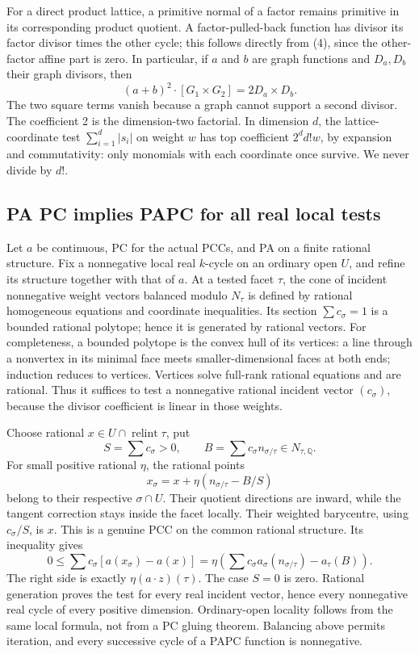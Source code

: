 \documentclass[
  10pt,
]{article}
\begin{document}
For a direct product lattice, a primitive normal of a factor remains
primitive in its corresponding product quotient. A factor-pulled-back
function has divisor its factor divisor times the other cycle; this
follows directly from (4), since the other-factor affine part is zero.
In particular, if \(a\) and \(b\) are graph functions and \(D_a,D_b\)
their graph divisors, then \[
 (a+b)^2\cdot[G_1\times G_2]=2D_a\times D_b.                  \tag{7}
\] The two square terms vanish because a graph cannot support a second
divisor. The coefficient 2 is the dimension-two factorial. In dimension
\(d\), the lattice-coordinate test \(\sum_{i=1}^d|s_i|\) on weight \(w\)
has top coefficient \(2^d d!w\), by expansion and commutativity: only
monomials with each coordinate once survive. We never divide by \(d!\).

\subsection{PA PC implies PAPC for all real local
tests}\label{pa-pc-implies-papc-for-all-real-local-tests}

Let \(a\) be continuous, PC for the actual PCCs, and PA on a finite
rational structure. Fix a nonnegative local real \(k\)-cycle on an
ordinary open \(U\), and refine its structure together with that of
\(a\). At a tested facet \(\tau\), the cone of incident nonnegative
weight vectors balanced modulo \(N_\tau\) is defined by rational
homogeneous equations and coordinate inequalities. Its section
\(\sum c_\sigma=1\) is a bounded rational polytope; hence it is
generated by rational vectors. For completeness, a bounded polytope is
the convex hull of its vertices: a line through a nonvertex in its
minimal face meets smaller-dimensional faces at both ends; induction
reduces to vertices. Vertices solve full-rank rational equations and are
rational. Thus it suffices to test a nonnegative rational incident
vector \((c_\sigma)\), because the divisor coefficient is linear in
those weights.

Choose rational \(x\in U\cap\operatorname{relint}\tau\), put \[
 S=\sum c_\sigma>0,\qquad B=\sum c_\sigma n_{\sigma/\tau}\in N_{\tau,\mathbb Q}.
\] For small positive rational \(\eta\), the rational points \[
 x_\sigma=x+\eta(n_{\sigma/\tau}-B/S)
\] belong to their respective \(\sigma\cap U\). Their quotient
directions are inward, while the tangent correction stays inside the
facet locally. Their weighted barycentre, using \(c_\sigma/S\), is
\(x\). This is a genuine PCC on the common rational structure. Its
inequality gives \[
 0\leq\sum c_\sigma[a(x_\sigma)-a(x)]
 =\eta\left(\sum c_\sigma a_\sigma(n_{\sigma/\tau})-a_\tau(B)\right).
\] The right side is exactly \(\eta(a\cdot z)(\tau)\). The case \(S=0\)
is zero. Rational generation proves the test for every real incident
vector, hence every nonnegative real cycle of every positive dimension.
Ordinary-open locality follows from the same local formula, not from a
PC gluing theorem. Balancing above permits iteration, and every
successive cycle of a PAPC function is nonnegative.
\end{document}
